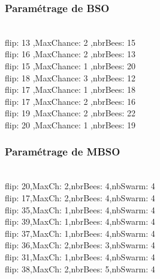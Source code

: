 \noindent
\begin{minipage}[t]{0.45\textwidth}
\subsubsection{Paramétrage de BSO}
\vspace{-0.5cm}
\textbf{}\\
flip: 13 ,MaxChance: 2 ,nbrBees: 15\\
flip: 16 ,MaxChance: 2 ,nbrBees: 13\\
flip: 15 ,MaxChance: 1 ,nbrBees: 20\\
flip: 18 ,MaxChance: 3 ,nbrBees: 12\\
flip: 17 ,MaxChance: 1 ,nbrBees: 18\\
flip: 17 ,MaxChance: 2 ,nbrBees: 16\\
flip: 19 ,MaxChance: 2 ,nbrBees: 22\\
flip: 20 ,MaxChance: 1 ,nbrBees: 19 
\end{minipage}\hfill
\hspace{1cm}
\begin{minipage}[t]{0.6\textwidth}
\subsubsection{Paramétrage de MBSO}
\vspace{-0.5cm}
\textbf{}\\
flip: 20,MaxCh: 2,nbrBees: 4,nbSwarm: 4\\
flip: 17,MaxCh: 2,nbrBees: 4,nbSwarm: 4\\
flip: 35,MaxCh: 1,nbrBees: 4,nbSwarm: 4\\
flip: 39,MaxCh: 1,nbrBees: 4,nbSwarm: 4\\
flip: 37,MaxCh: 1,nbrBees: 4,nbSwarm: 4\\
flip: 36,MaxCh: 2,nbrBees: 3,nbSwarm: 4\\
flip: 31,MaxCh: 1,nbrBees: 4,nbSwarm: 4\\
flip: 38,MaxCh: 2,nbrBees: 5,nbSwarm: 4
\end{minipage}\hfill


\textbf{ }\\



